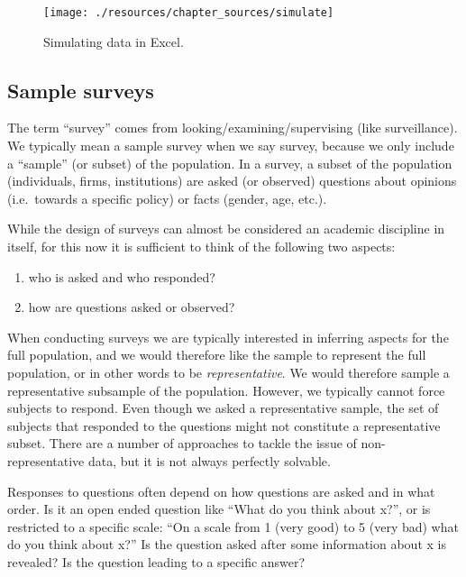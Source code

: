 \documentclass[
]{book}
\providecommand{\tightlist}{%
  \setlength{\itemsep}{0pt}\setlength{\parskip}{0pt}}
\begin{document}
\begin{figure}

{\centering \texttt{[image: ./resources/chapter\_sources/simulate]} 

}

\caption{Simulating data in Excel.}\label{fig:source0}
\end{figure}

\hypertarget{sample-surveys}{%
\subsection*{Sample surveys}\label{sample-surveys}}

The term ``survey'' comes from looking/examining/supervising (like surveillance). We typically mean a sample survey when we say survey, because we only include a ``sample'' (or subset) of the population. In a survey, a subset of the population (individuals, firms, institutions) are asked (or observed) questions about opinions (i.e.~towards a specific policy) or facts (gender, age, etc.).

While the design of surveys can almost be considered an academic discipline in itself, for this now it is sufficient to think of the following two aspects:

\begin{enumerate}
\def\labelenumi{\arabic{enumi}.}
\tightlist
\item
  who is asked and who responded?
\item
  how are questions asked or observed?
\end{enumerate}

When conducting surveys we are typically interested in inferring aspects for the full population, and we would therefore like the sample to represent the full population, or in other words to be \emph{representative}. We would therefore sample a representative subsample of the population. However, we typically cannot force subjects to respond. Even though we asked a representative sample, the set of subjects that responded to the questions might not constitute a representative subset. There are a number of approaches to tackle the issue of non-representative data, but it is not always perfectly solvable.

Responses to questions often depend on how questions are asked and in what order. Is it an open ended question like ``What do you think about x?'', or is restricted to a specific scale: ``On a scale from 1 (very good) to 5 (very bad) what do you think about x?'' Is the question asked after some information about x is revealed? Is the question leading to a specific answer?
\end{document}
